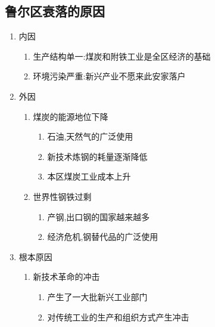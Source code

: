 \documentclass[a4paper]{article}
\begin{document}
    \subsection{鲁尔区衰落的原因}
    \begin{enumerate}
        \item 内因
        \begin{enumerate}
            \item 生产结构单一:煤炭和附铁工业是全区经济的基础 %
            \item 环境污染严重:新兴产业不愿来此安家落户
        \end{enumerate}
        \item 外因
        \begin{enumerate}
            \item 煤炭的能源地位下降
            \begin{enumerate}
                \item 石油,天然气的广泛使用
                \item 新技术炼钢的耗量逐渐降低
                \item 本区煤炭工业成本上升
            \end{enumerate}
            \item 世界性钢铁过剩
            \begin{enumerate}
                \item 产钢,出口钢的国家越来越多
                \item 经济危机,钢替代品的广泛使用
            \end{enumerate}
        \end{enumerate}
        \item 根本原因
        \begin{enumerate}
            \item 新技术革命的冲击
            \begin{enumerate}
                \item 产生了一大批新兴工业部门
                \item 对传统工业的生产和组织方式产生冲击
            \end{enumerate}
        \end{enumerate}
    \end{enumerate}
\end{document}
